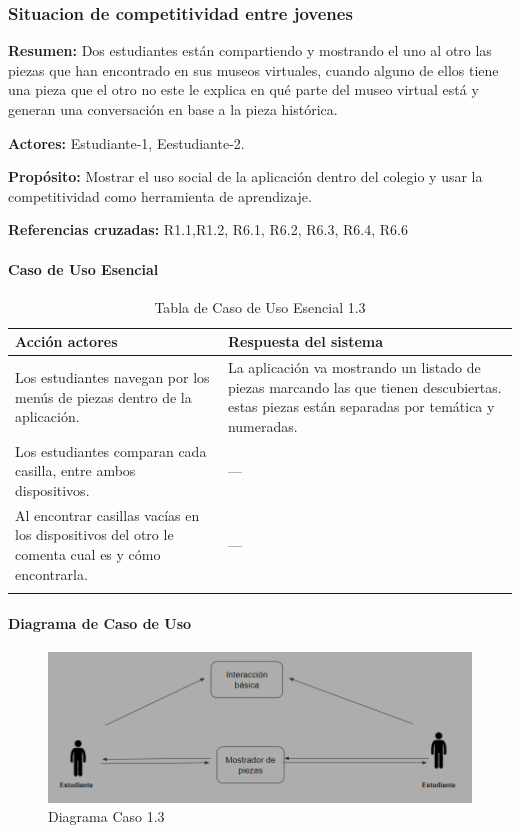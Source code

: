 \subsubsection{Situacion de competitividad entre jovenes}

{\textbf {Resumen:}}
Dos estudiantes están compartiendo y mostrando el uno al otro las piezas que han encontrado en sus museos virtuales, cuando alguno de ellos tiene una pieza que el otro no este le explica en qué parte del museo virtual está y generan una conversación en base a la pieza histórica.

{\textbf {Actores:}}
Estudiante-1, Eestudiante-2.

{\textbf {Propósito:}}
Mostrar el uso social de la aplicación dentro del colegio y usar la competitividad como herramienta de aprendizaje.

{\textbf {Referencias cruzadas:}}
R1.1,R1.2, R6.1, R6.2, R6.3, R6.4, R6.6

\paragraph{Caso de Uso Esencial}

\begin{longtable}{|p{5cm}|p{8cm}|}
\hline 
Acción actores & Respuesta del sistema \\ 
\hline 
Los estudiantes navegan por los menús de piezas dentro de la aplicación. & La aplicación va mostrando un listado de piezas marcando las que tienen descubiertas.
estas piezas están separadas por temática y numeradas.
 \\ 
\hline 
Los estudiantes comparan cada casilla, entre ambos dispositivos. & --- \\
\hline 
Al encontrar casillas vacías en los dispositivos del otro le comenta cual es y cómo encontrarla.  & --- \\
\hline 
\caption{Tabla de Caso de Uso Esencial 1.3}
\label{tab23}
\end{longtable}

\paragraph{Diagrama de Caso de Uso}

\begin{figure}[H]
\centerline{\includegraphics[width=15cm]{imgs/CasoUso_3.PNG}}
\caption{Diagrama Caso 1.3}
\label{fig_3_1}
\end{figure}

